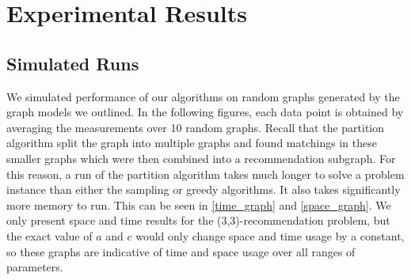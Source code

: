 \section{Experimental Results}

\subsection{Simulated Runs}
We simulated performance of our algorithms on random graphs generated
by the graph models we outlined. In the following figures, each data
point is obtained by averaging the measurements over 10 random
graphs. Recall that the partition algorithm split the graph into multiple graphs
and found matchings in these smaller graphs which were then combined into
a recommendation subgraph. For this reason, a run of the partition
algorithm takes much longer to solve a problem instance than either the
sampling or greedy algorithms. It also takes significantly more memory to
run. This can be seen in \ref{time_graph} and \ref{space_graph}. We only present
space and time results for the (3,3)-recommendation problem, but the exact value
of $a$ and $c$ would only change space and time usage by a constant, so these
graphs are indicative of time and space usage over all ranges of parameters.\vs

